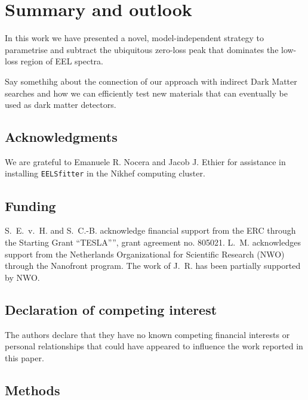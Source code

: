 \section{Summary and outlook}
\label{sec:summary}

In this work we have presented a novel, model-independent strategy to parametrise and subtract
the ubiquitous zero-loss peak that dominates  the low-loss region
of EEL spectra.


Say somethihg about the connection of our approach with
indirect Dark Matter searches and how we can efficiently
test new materials that can eventually be used
as dark matter detectors.

\subsection*{Acknowledgments}

We are grateful to Emanuele R. Nocera and Jacob J. Ethier for
assistance in installing {\tt EELSfitter} in the Nikhef computing cluster.


\subsection*{Funding}

S.~E.~v.~H. and S.~C.-B. acknowledge financial support
from the ERC through the Starting Grant ``TESLA”'', grant agreement
no. 805021.
%
L.~M. acknowledges support from the
Netherlands Organizational for Scientific Research (NWO)
through the Nanofront program.
%
The work of J.~R. has been partially supported by NWO.

\subsection*{Declaration of competing interest}

The authors declare that they have no known competing financial interests or personal relationships that could have appeared to influence the work reported in this paper.

\subsection*{Methods}

